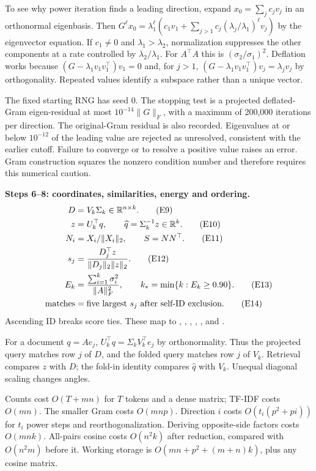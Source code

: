 To see why power iteration finds a leading direction, expand
$x_0=\sum_j c_jv_j$ in an orthonormal eigenbasis. Then
$G^\ell x_0=\lambda_1^\ell(c_1v_1+
\sum_{j>1}c_j(\lambda_j/\lambda_1)^\ell v_j)$ by the eigenvector equation.
If $c_1\ne0$ and $\lambda_1>\lambda_2$, normalization suppresses the
other components at a rate controlled by $\lambda_2/\lambda_1$.
For $A^\top A$ this is $(\sigma_2/\sigma_1)^2$.
Deflation works because
$(G-\lambda_1v_1v_1^\top)v_1=0$ and, for $j>1$,
$(G-\lambda_1v_1v_1^\top)v_j=\lambda_jv_j$ by orthogonality.
Repeated values identify a subspace rather than a unique vector.

The fixed starting RNG has seed 0. The stopping test is a projected
deflated-Gram eigen-residual at most $10^{-14}\|G\|_F$, with a maximum
of 200,000 iterations per direction. The original-Gram residual is
also recorded. Eigenvalues at or below $10^{-12}$ of the leading
value are rejected as unresolved, consistent with the earlier cutoff.
Failure to converge or to resolve a positive value raises an error.
Gram construction squares the nonzero condition number and therefore
requires this numerical caution.

\textbf{Steps 6--8: coordinates, similarities, energy and ordering.}
\begin{align}
D&=V_k\Sigma_k\in\mathbb{R}^{n\times k}. \tag{E9}\\
z&=U_k^\top q,\qquad \widehat q=\Sigma_k^{-1}z\in\mathbb{R}^k. \tag{E10}\\
N_i&=X_i/\|X_i\|_2,\qquad S=NN^\top. \tag{E11}\\
s_j&=\frac{D_j^\top z}{\|D_j\|_2\|z\|_2}. \tag{E12}\\
E_k&=\frac{\sum_{i=1}^k\sigma_i^2}{\|A\|_F^2},\qquad
k_*=\min\{k:E_k\ge0.90\}. \tag{E13}\\
\mathrm{matches}&=\text{five largest }s_j\text{ after self-ID exclusion}. \tag{E14}
\end{align}
Ascending ID breaks score ties. These map to
, ,
, ,
,  and
.

For a document $q=Ae_j$, $U_k^\top q=\Sigma_kV_k^\top e_j$
by orthonormality. Thus the projected query matches row $j$ of $D$,
and the folded query matches row $j$ of $V_k$.
Retrieval compares $z$ with $D$; the fold-in identity compares
$\widehat q$ with $V_k$. Unequal diagonal scaling changes angles.

Counts cost $O(T+mn)$ for $T$ tokens and a dense matrix; TF-IDF costs
$O(mn)$. The smaller Gram costs $O(mnp)$. Direction $i$ costs
$O(t_i(p^2+pi))$ for $t_i$ power steps and reorthogonalization.
Deriving opposite-side factors costs $O(mnk)$. All-pairs cosine costs
$O(n^2k)$ after reduction, compared with $O(n^2m)$ before it.
Working storage is $O(mn+p^2+(m+n)k)$, plus any cosine matrix.


